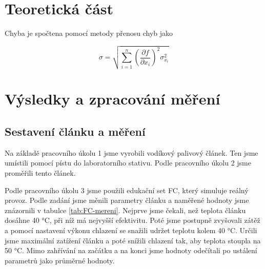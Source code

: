\section{Teoretická část}

Chyba je spočtena pomocí metody přenosu chyb \cite{bib:metoda-prenosu-chyb} jako

\begin{equation}
    \sigma = \sqrt{\sum^n_{i=1} \left( \frac{\partial f}{\partial x_i} \right)^2 \sigma^2_{x_i}}
\end{equation}

\section{Výsledky a zpracování měření}

\subsection{Sestavení článku a měření}

Na základě pracovního úkolu 1 jsme vyrobili vodíkový palivový článek. Ten jsme umístili pomocí pístu do laboratorního stativu. Podle pracovního úkolu 2 jsme proměřili tento článek.

Podle pracovního úkolu 3 jsme použili edukační set FC, který simuluje reálný provoz. Podle zadání jsme měnili parametry článku a naměřené hodnoty jsme znázornili v tabulce \ref{tab:FC-mereni}. Nejprve jsme čekali, než teplota článku dosáhne 40 °C, při níž má nejvyšší efektivitu. Poté jsme postupně zvyšovali zátěž a pomocí nastavení výkonu chlazení se snažili udržet teplotu kolem 40 °C. Určili jsme maximální zatížení článku a poté snížili chlazení tak, aby teplota stoupla na 50 °C. Mimo zahřívání na začátku a na konci jsme hodnoty odečítali po ustálení parametrů jako průměrné hodnoty.

